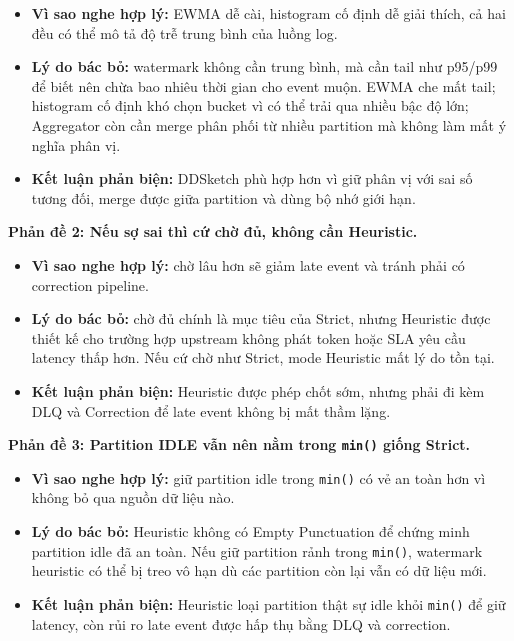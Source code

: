 \documentclass[12pt,a4paper]{article}
\begin{document}
\begin{itemize}
\item \textbf{Vì sao nghe hợp lý:} EWMA dễ cài, histogram cố định dễ giải thích, cả hai đều có thể mô tả độ trễ trung bình của luồng log.
\item \textbf{Lý do bác bỏ:} watermark không cần trung bình, mà cần tail  như p95/p99 để biết nên chừa bao nhiêu thời gian cho event muộn. EWMA che mất tail; histogram cố định khó chọn bucket vì  có thể trải qua nhiều bậc độ lớn; Aggregator còn cần merge phân phối từ nhiều partition mà không làm mất ý nghĩa phân vị.
\item \textbf{Kết luận phản biện:} DDSketch phù hợp hơn vì giữ phân vị với sai số tương đối, merge được giữa partition và dùng bộ nhớ giới hạn.
\end{itemize}
\textbf{Phản đề 2: Nếu sợ sai thì cứ chờ đủ, không cần Heuristic.}

\begin{itemize}
\item \textbf{Vì sao nghe hợp lý:} chờ lâu hơn sẽ giảm late event và tránh phải có correction pipeline.
\item \textbf{Lý do bác bỏ:} chờ đủ chính là mục tiêu của Strict, nhưng Heuristic được thiết kế cho trường hợp upstream không phát token hoặc SLA yêu cầu latency thấp hơn. Nếu cứ chờ như Strict, mode Heuristic mất lý do tồn tại.
\item \textbf{Kết luận phản biện:} Heuristic được phép chốt sớm, nhưng phải đi kèm DLQ và Correction để late event không bị mất thầm lặng.
\end{itemize}
\textbf{Phản đề 3: Partition IDLE vẫn nên nằm trong \texttt{min()} giống Strict.}

\begin{itemize}
\item \textbf{Vì sao nghe hợp lý:} giữ partition idle trong \texttt{min()} có vẻ an toàn hơn vì không bỏ qua nguồn dữ liệu nào.
\item \textbf{Lý do bác bỏ:} Heuristic không có Empty Punctuation để chứng minh partition idle đã an toàn. Nếu giữ partition rảnh trong \texttt{min()}, watermark heuristic có thể bị treo vô hạn dù các partition còn lại vẫn có dữ liệu mới.
\item \textbf{Kết luận phản biện:} Heuristic loại partition thật sự idle khỏi \texttt{min()} để giữ latency, còn rủi ro late event được hấp thụ bằng DLQ và correction.
\end{itemize}
\end{document}
